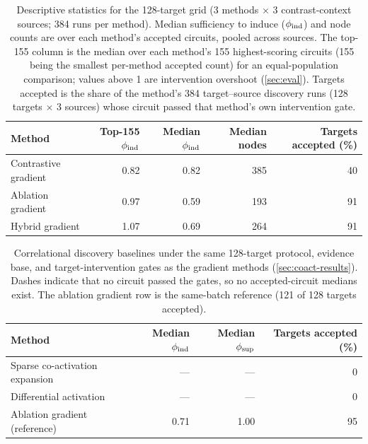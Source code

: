 \documentclass[10pt]{article}
\begin{document}
\begin{table}
\centering
\small
\setlength{\tabcolsep}{4.5pt}
\begin{tabular}{lrrrr}
\toprule
\textbf{Method} & \textbf{Top-155 $\phi_{\mathrm{ind}}$} & \textbf{Median $\phi_{\mathrm{ind}}$} & \textbf{Median nodes} & \textbf{Targets accepted (\%)} \\
\midrule
Contrastive gradient    & 0.82 & 0.82 & 385 & 40 \\
Ablation gradient       & 0.97 & 0.59 & 193 & 91 \\
Hybrid gradient         & 1.07 & 0.69 & 264 & 91 \\
\bottomrule
\end{tabular}
\caption{Descriptive statistics for the 128-target grid (3 methods $\times$ 3 contrast-context sources; 384 runs per method).
Median sufficiency to induce ($\phi_{\mathrm{ind}}$) and node counts are over each method's accepted circuits, pooled across sources.
The top-155 column is the median over each method's 155 highest-scoring circuits (155 being the smallest per-method accepted count) for an equal-population comparison; values above 1 are intervention overshoot (\cref{sec:eval}).
Targets accepted is the share of the method's 384 target--source discovery runs (128 targets $\times$ 3 sources) whose circuit passed that method's own intervention gate.}
\label{tab:grid-descriptives}
\end{table}

\begin{table}
\centering
\small
\begin{tabular}{lrrr}
\toprule
\textbf{Method} & \textbf{Median $\phi_{\mathrm{ind}}$} & \textbf{Median $\phi_{\mathrm{sup}}$} & \textbf{Targets accepted (\%)} \\
\midrule
Sparse co-activation expansion & --- & --- & 0 \\
Differential activation        & --- & --- & 0 \\
Ablation gradient (reference)  & 0.71 & 1.00 & 95 \\
\bottomrule
\end{tabular}
\caption{Correlational discovery baselines under the same 128-target protocol, evidence base, and target-intervention gates as the gradient methods (\cref{sec:coact-results}).
Dashes indicate that no circuit passed the gates, so no accepted-circuit medians exist.
The ablation gradient row is the same-batch reference (121 of 128 targets accepted).}
\label{tab:coact-methods}
\end{table}
\end{document}
